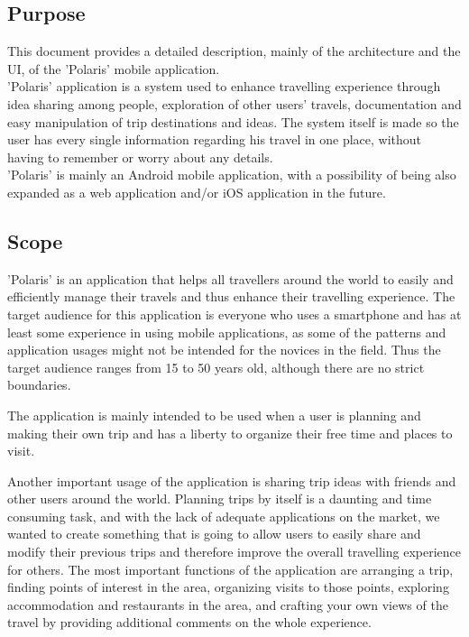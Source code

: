 \subsection{Purpose}
\hspace{\parindent}This document provides a detailed description, mainly of the  architecture and the UI, of the 'Polaris' mobile application.\\
'Polaris' application is a system used to enhance travelling experience through idea sharing among people, exploration of other users' travels, documentation and easy manipulation of trip destinations and ideas. The system itself is made so the user has every single information regarding his travel in one place, without having to remember or worry about any details.\\
'Polaris' is mainly an Android mobile application, with a possibility of being also expanded as a web application and/or iOS application in the future.  
\newpage

\subsection{Scope}
\hspace{\parindent}'Polaris' is an application that helps all travellers around the world to easily and efficiently manage their travels and thus enhance their travelling experience. The target audience for this application is everyone who uses a smartphone and has at least some experience in using mobile applications, as some of the patterns and application usages might not be intended for the novices in the field. Thus the target audience ranges from 15 to 50 years old, although there are no strict boundaries.\linebreak


The application is mainly intended to be used when a user is planning and making their own trip and has a liberty to organize their free time and places to visit.\linebreak


Another important usage of the application is sharing trip ideas with friends and other users around the world. Planning trips by itself is a daunting and time consuming task, and with the lack of adequate applications on the market, we wanted to create something that is going to allow users to easily share and modify their previous trips and therefore improve the overall travelling experience for others. 
\break
The most important functions of the application are arranging a trip, finding points of interest in the area, organizing visits to those points, exploring accommodation and restaurants in the area, and crafting your own views of the travel by providing additional comments on the whole experience.


